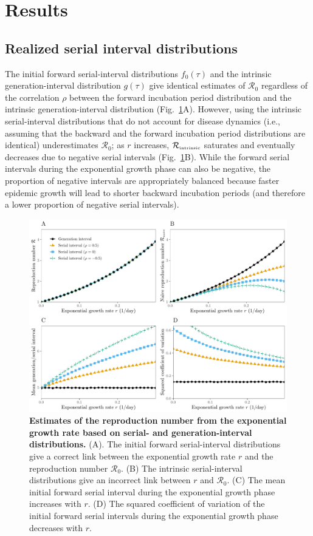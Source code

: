 \documentclass[12pt]{article}
\newcommand{\fref}[1]{Fig.~\ref{fig:#1}}
\newcommand{\Rx}[1]{\ensuremath{{\mathcal R}_{#1}}\xspace}
\newcommand{\Ro}{\Rx{0}}
\newcommand{\Rintrinsic}{\ensuremath{{\mathcal R}_{\textrm{\tiny intrinsic}}}\xspace}
\newcommand{\gdist}{g} %
\begin{document}
\section{Results}

\subsection{Realized serial interval distributions}

The initial forward serial-interval distributions $f_0(\tau)$ and the intrinsic generation-interval distribution $\gdist(\tau)$ give identical estimates of \Ro regardless of the correlation $\rho$ between the forward incubation period distribution and the intrinsic generation-interval distribution (\fref{rR}A).
However, using the intrinsic serial-interval distributions that do not account for disease dynamics (i.e., assuming that the backward and the forward incubation period distributions are identical) underestimates \Ro;
as $r$ increases, \Rintrinsic saturates and eventually decreases due to negative serial intervals (\fref{rR}B).
While the forward serial intervals during the exponential growth phase can also be negative, the proportion of negative intervals are appropriately balanced because faster epidemic growth will lead to shorter backward incubation periods (and therefore a lower proportion of negative serial intervals).

\begin{figure}[!th]
\includegraphics[width=\textwidth]{rR.pdf}
\caption{
\textbf{Estimates of the reproduction number from the exponential growth rate based on serial- and generation-interval distributions.}
(A). The initial forward serial-interval distributions give a correct link between the exponential growth rate $r$ and the reproduction number \Ro.
(B) The intrinsic serial-interval distributions give an incorrect link between $r$ and \Ro.
(C) The mean initial forward serial interval during the exponential growth phase increases with $r$.
(D) The squared coefficient of variation of the initial forward serial intervals during the exponential growth phase decreases with $r$.
}
\label{fig:rR}
\end{figure}
\end{document}
